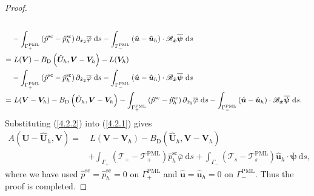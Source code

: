 \documentclass[10pt,a4paper]{amsart}
\begin{document}
\begin{proof}
\begin{align}
		\notag\\
		&-\int_{\Gamma_+^\mathrm{PML}}\left(\hat{p}^{\mathrm{sc}}-\hat{p}^{\mathrm{sc}}_h\right) \partial_{\hat{x}_2} \overline{\varphi} \mathrm{~d} s
		- \int_{\Gamma_-^\mathrm{PML}} \left(\hat{\boldsymbol{u}}-\hat{\boldsymbol{u}}_h\right) \cdot \mathscr{B}_{\hat{\boldsymbol{x}}} \overline{\boldsymbol{\psi}} \mathrm{~d} s \notag\\
		=& ~L(\boldsymbol{V}) - B_\mathrm{D}\left(\hat{\boldsymbol{U}}_h, \boldsymbol{V}-\boldsymbol{V}_h\right)- L(\boldsymbol{V}_h)
		\notag\\
		&-\int_{\Gamma_+^\mathrm{PML}}\left(\hat{p}^{\mathrm{sc}}-\hat{p}^{\mathrm{sc}}_h\right) \partial_{\hat{x}_2} \overline{\varphi} \mathrm{~d} s
		- \int_{\Gamma_-^\mathrm{PML}} \left(\hat{\boldsymbol{u}}-\hat{\boldsymbol{u}}_h\right) \cdot \mathscr{B}_{\hat{\boldsymbol{x}}} \overline{\boldsymbol{\psi}} \mathrm{~d} s \notag\\
		=&~ L(\boldsymbol{V}-\boldsymbol{V}_h)
		-B_\mathrm{D}\left(\hat{\boldsymbol{U}}_h,\boldsymbol{V}-\boldsymbol{V}_h\right)
		-\int_{\Gamma_+^\mathrm{PML}}\left(\hat{p}^{\mathrm{sc}}-\hat{p}^{\mathrm{sc}}_h\right) \partial_{\hat{x}_2} \overline{\varphi} \mathrm{~d} s
		- \int_{\Gamma_-^\mathrm{PML}} \left(\hat{\boldsymbol{u}}-\hat{\boldsymbol{u}}_h\right) \cdot \mathscr{B}_{\hat{\boldsymbol{x}}} \overline{\boldsymbol{\psi}} \mathrm{~d} s.
	\end{align}
	Substituting (\ref{4.2.2}) into (\ref{4.2.1}) gives
	\begin{align*}
		A\left(\boldsymbol{U}-\hat{\boldsymbol{U}}_{h}, \boldsymbol{V}\right)=&~ L(\boldsymbol{V}-\boldsymbol{V}_h)
		-B_\mathrm{D}\left(\hat{\boldsymbol{U}}_h,\boldsymbol{V}-\boldsymbol{V}_h\right) \\
		&+ \int_{\Gamma_+}\left(\mathscr{T}_+-\mathscr{T}_+^{\mathrm{PML}}\right)\hat{p}^{\mathrm{sc}}_h \overline{\varphi} \mathrm{~d} s
		+\int_{\Gamma_-}\left(\mathscr{T}_s-\mathscr{T}_s^{\mathrm{PML}}\right)\hat{\boldsymbol{u}}_h \cdot \overline{\boldsymbol{\psi}} \mathrm{~d} s,
	\end{align*}
	where we have used $\hat{p}^{\mathrm{sc}}=\hat{p}^{\mathrm{sc}}_h=0$ on $\Gamma_+^{\mathrm{PML}}$ and $\hat{\boldsymbol{u}}=\hat{\boldsymbol{u}}_h=0$ on $\Gamma_-^{\mathrm{PML}}$. Thus the proof is completed.
\end{proof}
\end{document}
